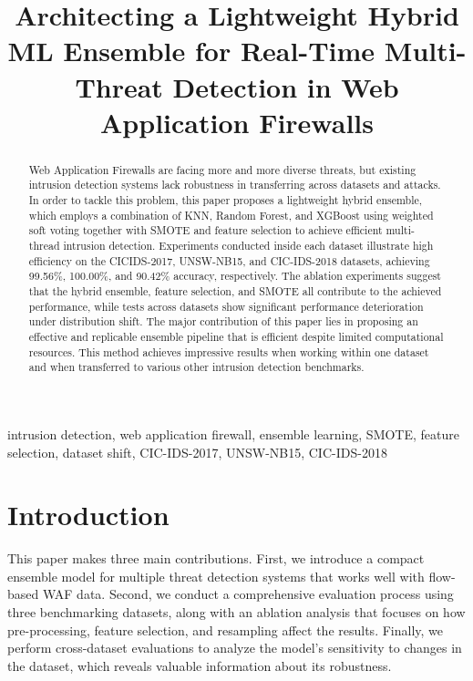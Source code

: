 \documentclass[conference]{IEEEtran}
\title{Architecting a Lightweight Hybrid ML Ensemble for Real-Time Multi-Threat Detection in Web Application Firewalls}
\author{
\IEEEauthorblockN{Md. Fahad Islam Togor, Md. Shakhawat Hossain Khan, Md. Rafiduzzaman, Mahzabeen Nourin, Md. Mazid-ul-Haque}
\IEEEauthorblockA{Department of Computer Science, American International University-Bangladesh (AIUB), Dhaka, Bangladesh}
}
\begin{document}
\maketitle

\begin{abstract}
Web Application Firewalls are facing more and more diverse threats, but existing intrusion detection systems lack robustness in transferring across datasets and attacks. In order to tackle this problem, this paper proposes a lightweight hybrid ensemble, which employs a combination of KNN, Random Forest, and XGBoost using weighted soft voting together with SMOTE and feature selection to achieve efficient multi-thread intrusion detection. Experiments conducted inside each dataset illustrate high efficiency on the CICIDS-2017, UNSW-NB15, and CIC-IDS-2018 datasets, achieving 99.56\%, 100.00\%, and 90.42\% accuracy, respectively. The ablation experiments suggest that the hybrid ensemble, feature selection, and SMOTE all contribute to the achieved performance, while tests across datasets show significant performance deterioration under distribution shift. The major contribution of this paper lies in proposing an effective and replicable ensemble pipeline that is efficient despite limited computational resources. This method achieves impressive results when working within one dataset and when transferred to various other intrusion detection benchmarks.
\end{abstract}

\begin{IEEEkeywords}
intrusion detection, web application firewall, ensemble learning, SMOTE, feature selection, dataset shift, CIC-IDS-2017, UNSW-NB15, CIC-IDS-2018
\end{IEEEkeywords}

\section{Introduction}
This paper makes three main contributions. First, we introduce a compact ensemble model for multiple threat detection systems that works well with flow-based WAF data. Second, we conduct a comprehensive evaluation process using three benchmarking datasets, along with an ablation analysis that focuses on how pre-processing, feature selection, and resampling affect the results. Finally, we perform cross-dataset evaluations to analyze the model's sensitivity to changes in the dataset, which reveals valuable information about its robustness.
\end{document}
